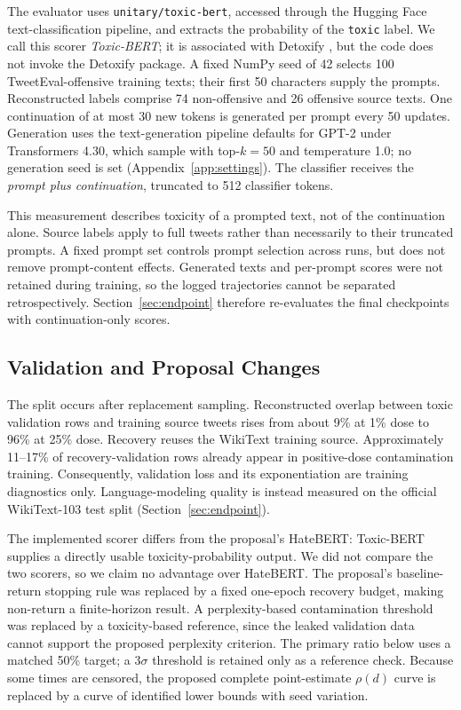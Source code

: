 \documentclass[11pt,a4paper]{article}
\begin{document}
The evaluator uses \texttt{unitary/toxic-bert}, accessed through the Hugging Face text-classification pipeline, and extracts the probability of the \texttt{toxic} label. We call this scorer \emph{Toxic-BERT}; it is associated with Detoxify \citep{hanu2020detoxify}, but the code does not invoke the Detoxify package. A fixed NumPy seed of 42 selects 100 TweetEval-offensive training texts; their first 50 characters supply the prompts. Reconstructed labels comprise 74 non-offensive and 26 offensive source texts. One continuation of at most 30 new tokens is generated per prompt every 50 updates. Generation uses the text-generation pipeline defaults for GPT-2 under Transformers 4.30, which sample with top-$k=50$ and temperature 1.0; no generation seed is set (Appendix~\ref{app:settings}). The classifier receives the \emph{prompt plus continuation}, truncated to 512 classifier tokens.

This measurement describes toxicity of a prompted text, not of the continuation alone. Source labels apply to full tweets rather than necessarily to their truncated prompts. A fixed prompt set controls prompt selection across runs, but does not remove prompt-content effects. Generated texts and per-prompt scores were not retained during training, so the logged trajectories cannot be separated retrospectively. Section~\ref{sec:endpoint} therefore re-evaluates the final checkpoints with continuation-only scores.

\subsection{Validation and Proposal Changes}
The split occurs after replacement sampling. Reconstructed overlap between toxic validation rows and training source tweets rises from about 9\% at 1\% dose to 96\% at 25\% dose. Recovery reuses the WikiText training source. Approximately 11--17\% of recovery-validation rows already appear in positive-dose contamination training. Consequently, validation loss and its exponentiation are training diagnostics only. Language-modeling quality is instead measured on the official WikiText-103 test split (Section~\ref{sec:endpoint}).

The implemented scorer differs from the proposal's HateBERT: Toxic-BERT supplies a directly usable toxicity-probability output. We did not compare the two scorers, so we claim no advantage over HateBERT. The proposal's baseline-return stopping rule was replaced by a fixed one-epoch recovery budget, making non-return a finite-horizon result. A perplexity-based contamination threshold was replaced by a toxicity-based reference, since the leaked validation data cannot support the proposed perplexity criterion. The primary ratio below uses a matched 50\% target; a $3\sigma$ threshold is retained only as a reference check. Because some times are censored, the proposed complete point-estimate $\rho(d)$ curve is replaced by a curve of identified lower bounds with seed variation.
\end{document}
